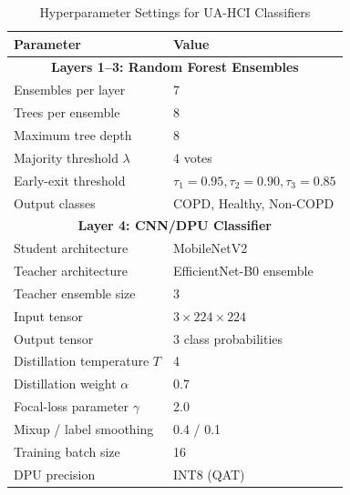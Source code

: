 \begin{table}[htbp]
    \centering
    \caption{Hyperparameter Settings for UA-HCI Classifiers}
    \label{tab:hyperparams}
    \small
    \renewcommand{\arraystretch}{1.25}
    \begin{tabular}{ll}
        \toprule
        \textbf{Parameter} & \textbf{Value} \\
        \midrule
        \multicolumn{2}{c}{\textbf{Layers 1--3: Random Forest Ensembles}} \\
        \midrule
        Ensembles per layer & 7 \\
        Trees per ensemble & 8 \\
        Maximum tree depth & 8 \\
        Majority threshold $\lambda$ & 4 votes \\
        Early-exit threshold & $\tau_1=0.95, \tau_2=0.90, \tau_3=0.85$ \\
        Output classes & COPD, Healthy, Non-COPD \\
        \midrule
        \multicolumn{2}{c}{\textbf{Layer 4: CNN/DPU Classifier}} \\
        \midrule
        Student architecture & MobileNetV2 \\
        Teacher architecture & EfficientNet-B0 ensemble \\
        Teacher ensemble size & 3 \\
        Input tensor & $3 \times 224 \times 224$ \\
        Output tensor & $3$ class probabilities \\
        Distillation temperature $T$ & 4 \\
        Distillation weight $\alpha$ & 0.7 \\
        Focal-loss parameter $\gamma$ & 2.0 \\
        Mixup / label smoothing & 0.4 / 0.1 \\
        Training batch size & 16 \\
        DPU precision & INT8 (QAT) \\
        \bottomrule
    \end{tabular}
\end{table}
